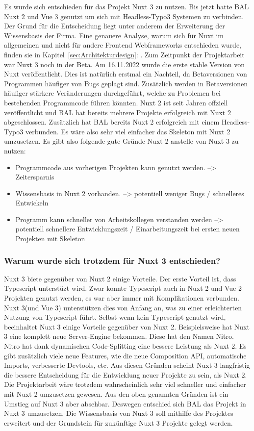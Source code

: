 Es wurde sich entschieden für das Projekt Nuxt 3 zu nutzen. Bis jetzt hatte \acs{BAL} Nuxt 2 und Vue 3 genutzt um sich mit Headless-Typo3 Systemen zu verbinden. Der Grund für die Entscheidung liegt unter anderem der Erweiterung der Wissensbasis der Firma. Eine genauere Analyse, warum sich für Nuxt im allgemeinen und nicht für andere Frontend Webframeworks entschieden wurde, finden sie in Kapitel~\ref{sec:Architekturdesign}: . Zum Zeitpunkt der Projektarbeit war Nuxt 3 noch in der Beta. Am 16.11.2022 wurde die erste stable Version von Nuxt veröffentlicht. Dies ist natürlich erstmal ein Nachteil, da Betaversionen von Programmen häufiger von Bugs geplagt sind. Zusätzlich werden in Betaversionen häufiger stärkere Veränderungen durchgeführt, welche zu Problemen bei bestehenden Programmcode führen könnten. Nuxt 2 ist seit Jahren offziell veröffentlicht und \acs{BAL} hat bereits mehrere Projekte erfolgreich mit Nuxt 2 abgeschlossen. Zusätzlich hat \acs{BAL} bereits Nuxt 2 erfolgreich mit einem Headless-Typo3 verbunden. Es wäre also sehr viel einfacher das Skeleton mit Nuxt 2 umzusetzen. Es gibt also folgende gute Gründe Nuxt 2 anstelle von Nuxt 3 zu nutzen:
\begin{itemize}
	\item Programmcode aus vorherigen Projekten kann genutzt werden. --> Zeitersparnis
	\item Wissensbasis in Nuxt 2 vorhanden. --> potentiell weniger Bugs / schnelleres Entwickeln
	\item Programm kann schneller von Arbeitskollegen verstanden werden --> potentiell schnellere Entwicklungszeit / Einarbeitungszeit bei ersten neuen Projekten mit Skeleton
\end{itemize}

\subsubsection{Warum wurde sich trotzdem für Nuxt 3 entschieden?}
\label{sec:Warum wurde sich trotzdem für Nuxt 3 entschieden?}

Nuxt 3 biete gegenüber von Nuxt 2 einige Vorteile. Der erste Vorteil ist, dass Typescript unterstüzt wird. Zwar konnte Typescript auch in Nuxt 2 und Vue 2 Projekten genutzt werden, es war aber immer mit Komplikationen verbunden. Nuxt 3(und Vue 3) unterstützen dies von Anfang an, was zu einer erleichterten Nutzung von Typescript führt. Selbst wenn kein Typescript genutzt wird, beeinhaltet Nuxt 3 einige Vorteile gegenüber von Nuxt 2. Beispielsweise hat Nuxt 3 eine komplett neue Server-Engine bekommen. Diese hat den Namen Nitro. Nitro hat dank dynamischen Code-Splitting eine bessere Leistung als Nuxt 2. Es gibt zusätzlich viele neue Features, wie die neue Composition API, automatische Imports, verbesserte Devtools, etc. Aus diesen Gründen scheint Nuxt 3 langfristig die bessere Entscheidung für die Entwicklung neuer Projekte zu sein, als Nuxt 2. Die Projektarbeit wäre trotzdem wahrscheinlich sehr viel schneller und einfacher mit Nuxt 2 umzusetzen gewesen. Aus den oben genannten Gründen ist ein Umstieg auf Nuxt 3 aber absehbar. Deswegen entschied sich \acs{BAL} das Projekt in Nuxt 3 umzusetzen. Die Wissensbasis von Nuxt 3 soll mithilfe des Projektes erweitert und der Grundstein für zukünftige Nuxt 3 Projekte gelegt werden.